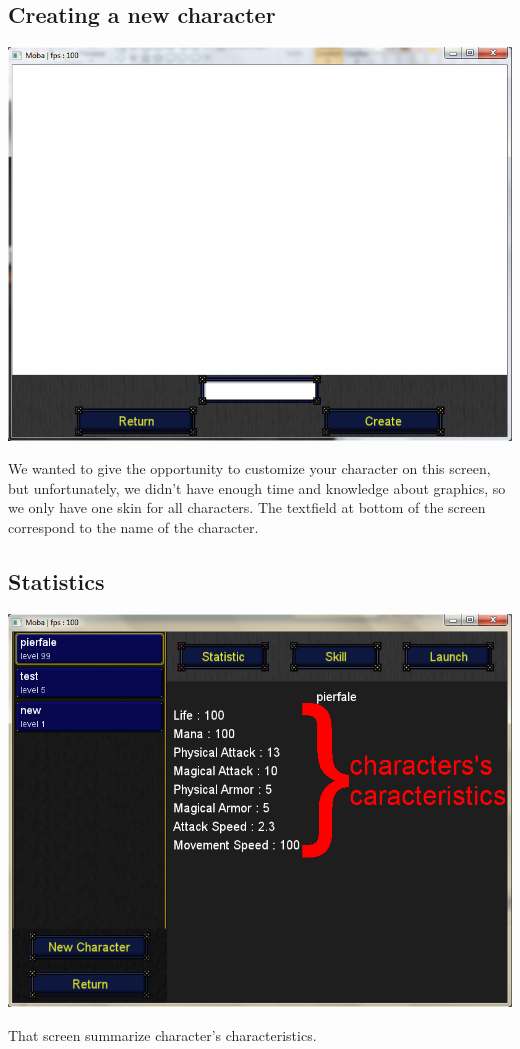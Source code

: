 \documentclass{scrreprt}
\begin{document}
			  \subsection{Creating a new character}
			  \begin{center}
			  \includegraphics[scale=0.4]{create_character.png}
			  \end{center}
			  We wanted to give the opportunity to customize your character on this screen, but unfortunately, we didn't have enough time and knowledge about graphics, so we only have one skin for all characters. The textfield at bottom of the screen correspond to the name of the character.
			  \subsection{Statistics}
			  \begin{center}
			  \includegraphics[scale=0.4]{stats_screen.png}
			  \end{center}
			  That screen summarize character's characteristics.
\end{document}
